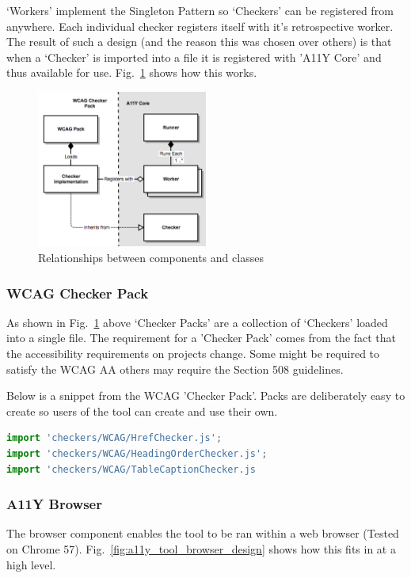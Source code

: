 `Workers' implement the Singleton Pattern so `Checkers' can be registered from
anywhere. Each individual checker registers itself with it's retrospective
worker. The result of such a design (and the reason this was chosen over others)
is that when a `Checker' is imported into a file it is registered with 'A11Y
Core' and thus available for use. Fig.~\ref{fig:a11y_tool_worker_design}
shows how this works.

\begin{figure}[H]
\centering
\includegraphics[width=0.5\textwidth]{figures/a11y_tool_worker_design}
\captionsetup{justification=centering}
\caption{Relationships between components and classes
\label{fig:a11y_tool_worker_design}}
\end{figure}

\subsubsection{WCAG Checker Pack}
As shown in Fig.~\ref{fig:a11y_tool_worker_design} above `Checker Packs' are
a collection of `Checkers' loaded into a single file. The requirement for a
'Checker Pack' comes from the fact that the accessibility requirements on
projects change. Some might be required to satisfy the WCAG AA others may
require the Section 508 guidelines.

Below is a snippet from the WCAG 'Checker Pack'. Packs are deliberately easy to
create so users of the tool can create and use their own.

\begin{lstlisting}[language=JavaScript]
import 'checkers/WCAG/HrefChecker.js';
import 'checkers/WCAG/HeadingOrderChecker.js';
import 'checkers/WCAG/TableCaptionChecker.js
\end{lstlisting}


\subsubsection{A11Y Browser}
The browser component enables the tool to be ran within a web browser (Tested
on Chrome 57). Fig.~\ref{fig:a11y_tool_browser_design} shows how this fits in
at a high level.

